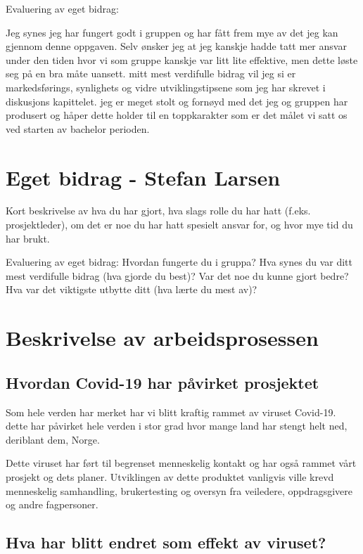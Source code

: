 \documentclass[11pt,a4paper]{report}
\begin{document}
Evaluering av eget bidrag:

Jeg synes jeg har fungert godt i gruppen og har fått frem mye av det jeg kan gjennom denne oppgaven. Selv ønsker jeg at jeg kanskje hadde tatt mer ansvar under den tiden hvor vi som gruppe kanskje var litt  lite effektive, men dette løste seg på en bra måte uansett. mitt mest verdifulle bidrag vil jeg si er markedsførings, synlighets og vidre utviklingstipsene som jeg har skrevet i diskusjons kapittelet. jeg er meget stolt og fornøyd med det jeg og gruppen har produsert og håper dette holder til en toppkarakter som er det målet vi satt os ved starten av bachelor perioden.

\section*{Eget bidrag - Stefan Larsen}

Kort beskrivelse av hva du har gjort, hva slags rolle du har hatt (f.eks. prosjektleder), om det er noe du har hatt spesielt ansvar for, og hvor mye tid du har  brukt.

Evaluering av eget bidrag: Hvordan fungerte du i gruppa? Hva synes du var ditt mest verdifulle bidrag (hva gjorde du best)? Var det noe du kunne gjort bedre? Hva var det viktigste utbytte ditt (hva lærte du mest av)? 

\section{Beskrivelse av arbeidsprosessen}

\subsection{Hvordan Covid-19 har påvirket prosjektet}

Som hele verden har merket har vi blitt kraftig rammet av viruset Covid-19. dette har påvirket hele verden i stor grad hvor mange land har stengt helt ned, deriblant dem, Norge.

Dette viruset har ført til begrenset menneskelig kontakt og har også rammet vårt prosjekt og dets planer. Utviklingen av dette produktet vanligvis ville krevd menneskelig samhandling, brukertesting og oversyn fra veiledere, oppdragsgivere og andre fagpersoner.

\subsection{Hva har blitt endret som effekt av viruset?}
\end{document}
